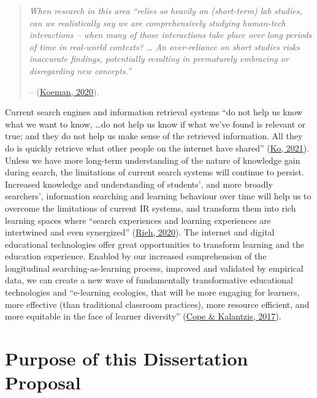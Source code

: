 \documentclass[a4paper, nobind]{templates/ociamthesis}
\begin{document}
\begin{quote}
\emph{When research in this area ``relies so heavily on (short-term) lab studies, can we
realistically say we are comprehensively studying human-tech
interactions -- when many of those interactions take place over long
periods of time in real-world contexts? \ldots{} An over-reliance on short
studies risks inaccurate findings, potentially resulting in prematurely
embracing or disregarding new concepts.''}

-- (\protect\hyperlink{ref-HCIUXres81_online}{Koeman, 2020}).
\end{quote}

Current search engines and information retrieval systems ``do not help us
know what we want to know, \ldots do not help us know if what we've found is
relevant or true; and they do not help us make sense of the retrieved
information. All they do is quickly retrieve what other people on the
internet have shared'' (\protect\hyperlink{ref-ko2021seeking}{Ko, 2021}). Unless we have more long-term
understanding of the nature of knowledge gain during search, the
limitations of current search systems will continue to persist.
Increased knowledge and understanding of students', and more broadly
searchers', information searching and learning behaviour over time will
help us to overcome the limitations of current IR systems, and transform
them into rich learning spaces where ``search experiences and learning
experiences are intertwined and even synergized'' (\protect\hyperlink{ref-url_rieh_homepage}{Rieh, 2020}).
The internet and digital educational technologies offer great
opportunities to transform learning and the education experience.
Enabled by our increased comprehension of the longitudinal
searching-as-learning process, improved and validated by empirical data,
we can create a new wave of fundamentally transformative educational
technologies and ``e-learning ecologies, that will be more engaging for
learners, more effective (than traditional classroom practices), more
resource efficient, and more equitable in the face of learner diversity''
(\protect\hyperlink{ref-cope2017elearningc}{Cope \& Kalantzis, 2017}).

\hypertarget{sec_intro_purpose}{%
\section{Purpose of this Dissertation Proposal}\label{sec_intro_purpose}}
\end{document}
